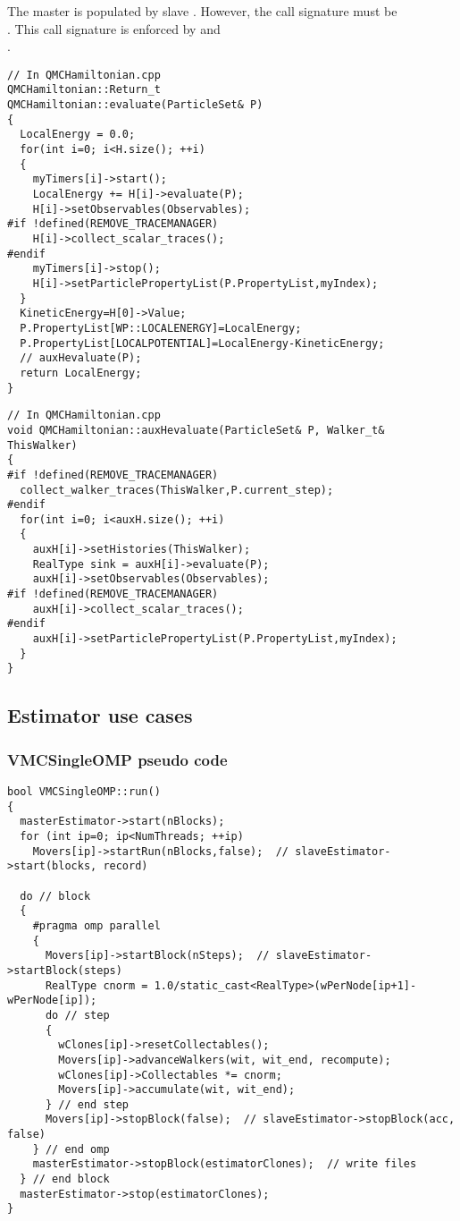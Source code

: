 The master  is populated by slave 
. However, the call signature must be 
 \\. This call signature is enforced by  and  \\.

\begin{lstlisting}
// In QMCHamiltonian.cpp
QMCHamiltonian::Return_t
QMCHamiltonian::evaluate(ParticleSet& P)
{
  LocalEnergy = 0.0;
  for(int i=0; i<H.size(); ++i)
  {
    myTimers[i]->start();
    LocalEnergy += H[i]->evaluate(P);
    H[i]->setObservables(Observables);
#if !defined(REMOVE_TRACEMANAGER)
    H[i]->collect_scalar_traces();
#endif
    myTimers[i]->stop();
    H[i]->setParticlePropertyList(P.PropertyList,myIndex);
  }
  KineticEnergy=H[0]->Value;
  P.PropertyList[WP::LOCALENERGY]=LocalEnergy;
  P.PropertyList[LOCALPOTENTIAL]=LocalEnergy-KineticEnergy;
  // auxHevaluate(P);
  return LocalEnergy;
}
\end{lstlisting}

\begin{lstlisting}
// In QMCHamiltonian.cpp
void QMCHamiltonian::auxHevaluate(ParticleSet& P, Walker_t& ThisWalker)
{
#if !defined(REMOVE_TRACEMANAGER)
  collect_walker_traces(ThisWalker,P.current_step);
#endif
  for(int i=0; i<auxH.size(); ++i)
  {
    auxH[i]->setHistories(ThisWalker);
    RealType sink = auxH[i]->evaluate(P);
    auxH[i]->setObservables(Observables);
#if !defined(REMOVE_TRACEMANAGER)
    auxH[i]->collect_scalar_traces();
#endif
    auxH[i]->setParticlePropertyList(P.PropertyList,myIndex);
  }
}
\end{lstlisting}

\subsection{Estimator use cases}

\subsubsection{VMCSingleOMP pseudo code}
\begin{lstlisting}
bool VMCSingleOMP::run()
{
  masterEstimator->start(nBlocks);
  for (int ip=0; ip<NumThreads; ++ip)
    Movers[ip]->startRun(nBlocks,false);  // slaveEstimator->start(blocks, record)
  
  do // block
  {
    #pragma omp parallel
    {
      Movers[ip]->startBlock(nSteps);  // slaveEstimator->startBlock(steps)
      RealType cnorm = 1.0/static_cast<RealType>(wPerNode[ip+1]-wPerNode[ip]);
      do // step
      {
        wClones[ip]->resetCollectables();
        Movers[ip]->advanceWalkers(wit, wit_end, recompute);
        wClones[ip]->Collectables *= cnorm;
        Movers[ip]->accumulate(wit, wit_end);
      } // end step
      Movers[ip]->stopBlock(false);  // slaveEstimator->stopBlock(acc, false)
    } // end omp
    masterEstimator->stopBlock(estimatorClones);  // write files
  } // end block
  masterEstimator->stop(estimatorClones);
}
\end{lstlisting}

